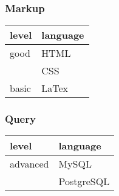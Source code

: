 \documentclass{article}
\begin{document}
\begin{multicols}{2}
\subsubsection{Markup}
\begin{tabular}{| m{5em} | m{12em} |}
    \hline
    \textbf{level} &  \textbf{language} \\
    \hline
    good & HTML \\
    & CSS \\
    \hline
    basic &  LaTex \\
    \hline
\end{tabular}
\subsubsection{Query}
\begin{tabular}{| m{5em} | m{12em} |}
    \hline
    \textbf{level} &  \textbf{language} \\
    \hline
    advanced & MySQL\\
    & PostgreSQL\\
    \hline
\end{tabular}
\end{multicols}
\end{document}
